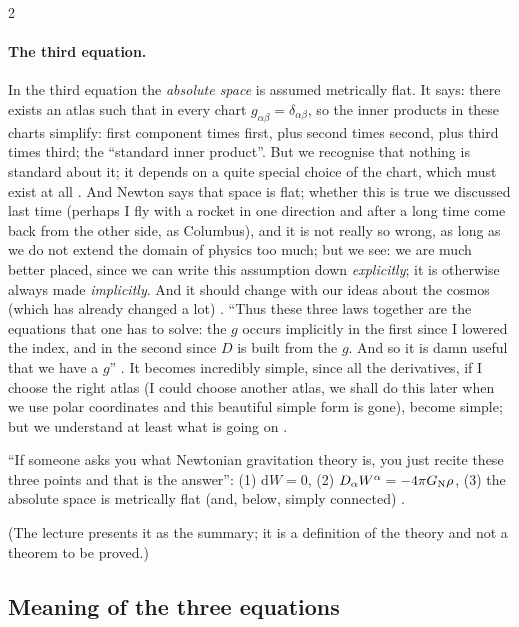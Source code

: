 \begin{paracol}{2}
\paragraph{The third equation.} In the third equation the \emph{absolute space} is assumed metrically flat. It says: there exists an atlas such that in every chart $g_{\alpha\beta}=\delta_{\alpha\beta}$, so the inner products in these charts simplify: first component times first, plus second times second, plus third times third; the ``standard inner product''. But we recognise that nothing is standard about it; it
depends on a quite special choice of the chart, which must exist at all . And Newton says that space is flat; whether this is true we discussed last time (perhaps I fly with a rocket in one direction and after a long time come back from the other side, as Columbus), and it is not really so wrong, as long as we do not extend the domain of physics too much; but we see: we are much better placed,
since we can write this assumption down \emph{explicitly}; it is otherwise always made \emph{implicitly}. And it should change with our ideas about the cosmos (which has already changed a lot) . ``Thus these three laws together are the equations that one has to solve: the $g$ occurs implicitly in the first since I lowered the index, and in the second since $D$ is built from the $g$. And so it is damn useful that we have a $g$'' .
It becomes incredibly simple, since all the derivatives, if I choose the right atlas (I could choose another atlas, we shall do this later when we use polar coordinates and this beautiful simple form is gone), become simple; but we understand at least what is going on .

\begin{theorem}\label{thm:ng-what}
``If someone asks you what Newtonian gravitation theory is, you just recite these three points and that is the answer'': (1) $\mathrm dW=0$, (2) $D_\alpha W^\alpha=-4\pi G_{\rm N}\rho$, (3) the absolute space is metrically flat (and, below, simply connected) .
\end{theorem}
(The lecture presents it as the summary; it is a definition of the theory and not a theorem to be proved.)

\subsection{Meaning of the three equations}\label{ssec:ng-meaning}


\end{paracol}
